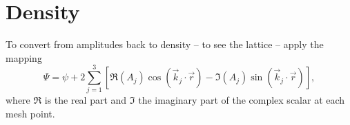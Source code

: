\documentclass[11pt]{article}
\begin{document}
\section{Density}
To convert from amplitudes back to density -- to see the lattice -- apply the mapping
\[
	\Psi = \psi + 2\sum_{j=1}^3\left[\Re(A_j)\cos\left(\vec{k}_j\cdot\vec{r}\right) - \Im(A_j)\sin\left(\vec{k}_j\cdot\vec{r}\right)\right],
\]
where $\Re$ is the real part and $\Im$ the imaginary part of the complex scalar at each mesh point.
\end{document}
